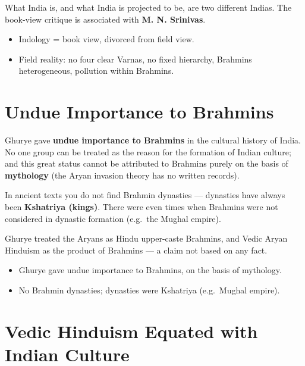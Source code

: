 \begin{CriticalPoint}
What India is, and what India is projected to be, are two different Indias. The book-view critique is associated with \textbf{M. N. Srinivas}.
\end{CriticalPoint}

\begin{QuickRevision}
\begin{itemize}
\item Indology = book view, divorced from field view.
\item Field reality: no four clear Varnas, no fixed hierarchy, Brahmins heterogeneous, pollution within Brahmins.
\end{itemize}
\end{QuickRevision}

\section{Undue Importance to Brahmins}

Ghurye gave \textbf{undue importance to Brahmins} in the cultural history of India. No one group can be treated as the reason for the formation of Indian culture; and this great status cannot be attributed to Brahmins purely on the basis of \textbf{mythology} (the Aryan invasion theory has no written records).

\begin{DataFact}
In ancient texts you do not find Brahmin dynasties --- dynasties have always been \textbf{Kshatriya (kings)}. There were even times when Brahmins were not considered in dynastic formation (e.g.\ the Mughal empire).
\end{DataFact}

\begin{CriticalPoint}
Ghurye treated the Aryans as Hindu upper-caste Brahmins, and Vedic Aryan Hinduism as the product of Brahmins --- a claim not based on any fact.
\end{CriticalPoint}

\begin{QuickRevision}
\begin{itemize}
\item Ghurye gave undue importance to Brahmins, on the basis of mythology.
\item No Brahmin dynasties; dynasties were Kshatriya (e.g.\ Mughal empire).
\end{itemize}
\end{QuickRevision}

\section{Vedic Hinduism Equated with Indian Culture}

